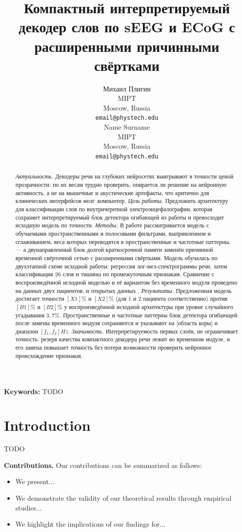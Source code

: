 \documentclass{article}
\title{Компактный интерпретируемый декодер слов по sEEG и ECoG с расширенными причинными свёртками}
\author{
  Михаил Плигин\\
  MIPT\\
  Moscow, Russia\\
  \texttt{email@phystech.edu}\\
  \And
  Name Surname\\
  MIPT\\
  Moscow, Russia\\
  \texttt{email@phystech.edu}\\
}
\begin{document}
\maketitle

\begin{abstract}
    \textit{Актуальность.} Декодеры речи на глубоких нейросетях выигрывают в точности ценой прозрачности: по их весам трудно проверить, опирается ли решение на нейронную активность, а не на мышечные и акустические артефакты, что критично для клинических интерфейсов мозг–компьютер.
    \textit{Цель работы.} Предложить архитектуру для классификации слов по внутричерепной электроэнцефалографии, которая сохраняет интерпретируемый блок детектора огибающей из работы \cite{Petrosyan2022} и превосходит исходную модель по точности. 
    \textit{Методы.} В работе рассматривается модель с обучаемыми пространственными и полосовыми фильтрами, выпрямлением и сглаживанием, веса которых переводятся в пространственные и частотные паттерны, — а двунаправленный блок долгой краткосрочной памяти заменён причинной временной свёрточной сетью с расширенными  свёртками. Модель обучалась по двухэтапной схеме исходной работы: регрессия лог-мел-спектрограммы речи, затем классификация 26 слов и тишины по промежуточным признакам. Сравнение с воспроизведённой исходной моделью и её вариантом без временного модуля проведено на данных двух пациентов, и открытых данных \cite{Verwoert2022}. 
    \textit{Результаты.} Предложенная модель достигает точности $[X1] \%$ и $[X2] \%$ (для 1 и 2 пациента соответственно) против $[B1]\%$ и $[B2]\%$ у воспроизведённой исходной архитектуры при уровне случайного угадывания $3,7\%$. Пространственные и частотные паттерны блок детектора огибающей после замены временного модуля сохраняются и указывают на [область коры] и диапазон $[f_1,f_2]Hz$.
    \textit{Значимость.} Интерпретируемость первых слоёв, не ограничивает точность: резерв качества компактного декодера речи лежит во временном модуле, и его замена повышает точность без потери возможности проверить нейронное происхождение признаков.
    
\end{abstract}

\textbf{Keywords:} TODO

\section{Introduction}\label{sec:intro}

TODO

\textbf{Contributions.} Our contributions can be summarized as follows:
\begin{itemize}
    \item We present...
    \item We demonstrate the validity of our theoretical results through empirical studies...
    \item We highlight the implications of our findings for...
\end{itemize}
\end{document}
